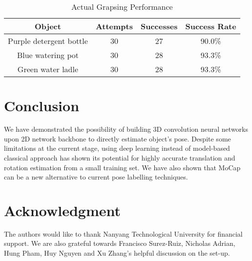\documentclass[conference]{IEEEtran}
\begin{document}
\begin{table}[htbp]
\caption{Actual Grapsing Performance}
\begin{center}
\begin{tabular}{|c|c|c|c|}
\hline
\textbf{Object}&\textbf{Attempts}&\textbf{Successes}&\textbf{Success Rate} \\
\hline
Purple detergent bottle&30&27&90.0\% \\
\hline
Blue watering pot&30&28&93.3\% \\
\hline
Green water ladle&30&28&93.3\% \\
\hline
\end{tabular}
\label{tab_actual_grasping_perf}
\end{center}
\end{table}


\section{Conclusion}
We have demonstrated the possibility of building 3D convolution neural networks upon 2D network backbone to directly estimate object's pose. Despite some limitations at the current stage, using deep learning instead of model-based classical approach has shown its potential for highly accurate translation and rotation estimation from a small training set. We have also shown that MoCap can be a new alternative to current pose labelling techniques.


\section{Acknowledgment}
The authors would like to thank Nanyang Technological University for financial support. We are also grateful towards Francisco Surez-Ruiz, Nicholas Adrian, Hung Pham, Huy Nguyen and Xu Zhang's helpful discussion on the set-up.




\end{document}

